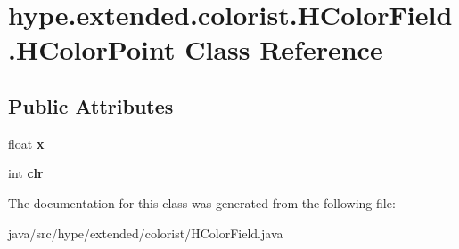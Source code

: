 \hypertarget{classhype_1_1extended_1_1colorist_1_1_h_color_field_1_1_h_color_point}{\section{hype.\-extended.\-colorist.\-H\-Color\-Field.\-H\-Color\-Point Class Reference}
\label{classhype_1_1extended_1_1colorist_1_1_h_color_field_1_1_h_color_point}
}
\subsection*{Public Attributes}
\begin{DoxyCompactItemize}
\item 
\hypertarget{classhype_1_1extended_1_1colorist_1_1_h_color_field_1_1_h_color_point_a0d743316a5c7c5a58feb5b2f19db9608}{float {\bfseries x}}\label{classhype_1_1extended_1_1colorist_1_1_h_color_field_1_1_h_color_point_a0d743316a5c7c5a58feb5b2f19db9608}

\item 
\hypertarget{classhype_1_1extended_1_1colorist_1_1_h_color_field_1_1_h_color_point_a2bb9083f131e8820f38f44e304b87804}{int {\bfseries clr}}\label{classhype_1_1extended_1_1colorist_1_1_h_color_field_1_1_h_color_point_a2bb9083f131e8820f38f44e304b87804}

\end{DoxyCompactItemize}


The documentation for this class was generated from the following file\-:\begin{DoxyCompactItemize}
\item 
java/src/hype/extended/colorist/H\-Color\-Field.\-java\end{DoxyCompactItemize}
